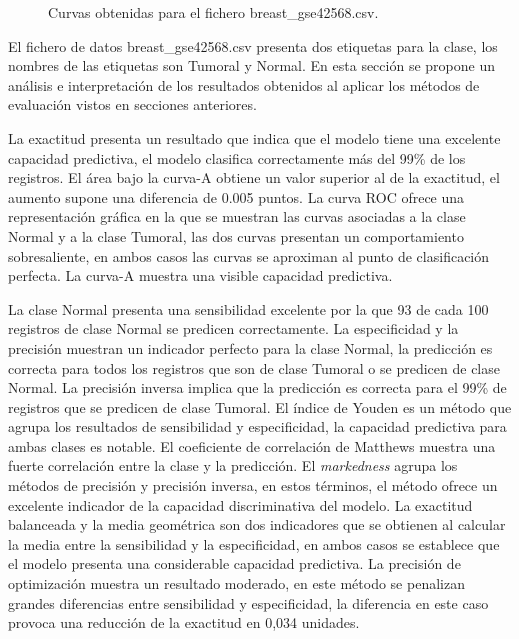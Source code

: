 \bigbreak

\begin{figure}[htp]
    \centering
    \caption{Curvas obtenidas para el fichero breast\_gse42568.csv.}
    \label{fig:13}
\end{figure}

\bigbreak

El fichero de datos breast\_gse42568.csv presenta dos etiquetas para la clase, los nombres de las etiquetas son Tumoral y Normal. En esta sección se propone un análisis e interpretación de los resultados obtenidos al aplicar los métodos de evaluación vistos en secciones anteriores.

\bigbreak

La exactitud presenta un resultado que indica que el modelo tiene una excelente capacidad predictiva, el modelo clasifica correctamente más del 99\% de los registros. El área bajo la curva-A obtiene un valor superior al de la exactitud, el aumento supone una diferencia de 0.005 puntos. La curva ROC ofrece una representación gráfica en la que se muestran las curvas asociadas a la clase Normal y a la clase Tumoral, las dos curvas presentan un comportamiento sobresaliente, en ambos casos las curvas se aproximan al punto de clasificación perfecta. La curva-A muestra una visible capacidad predictiva.

\bigbreak

La clase Normal presenta una sensibilidad excelente por la que 93 de cada 100 registros de clase Normal se predicen correctamente. La especificidad y la precisión muestran un indicador perfecto para la clase Normal, la predicción es correcta para todos los registros que son de clase Tumoral o se predicen de clase Normal. La precisión inversa implica que la predicción es correcta para el 99\% de registros que se predicen de clase Tumoral. El índice de Youden es un método que agrupa los resultados de sensibilidad y especificidad, la capacidad predictiva para ambas clases es notable. El coeficiente de correlación de Matthews muestra una fuerte correlación entre la clase y la predicción. El \textit{markedness} agrupa los métodos de precisión y precisión inversa, en estos términos, el método ofrece un excelente indicador de la capacidad discriminativa del modelo. La exactitud balanceada y la media geométrica son dos indicadores que se obtienen al calcular la media entre la sensibilidad y la especificidad, en ambos casos se establece que el modelo presenta una considerable capacidad predictiva. La precisión de optimización muestra un resultado moderado, en este método se penalizan grandes diferencias entre sensibilidad y especificidad, la diferencia en este caso provoca una reducción de la exactitud en 0,034 unidades.


